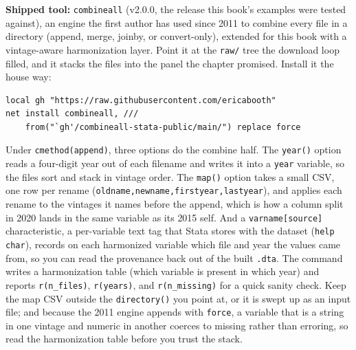 \begin{kaobox}[frametitle=Package Integration: \texttt{combineall}]
\textbf{Shipped tool:} \texttt{combineall} (v2.0.0, the release this book's examples were tested against), an engine the first author has used since 2011 to combine every file in a directory (append, merge, joinby, or convert-only), extended for this book with a vintage-aware harmonization layer. Point it at the \texttt{raw/} tree the download loop filled, and it stacks the files into the panel the chapter promised. Install it the house way:
\par
{\footnotesize
\begin{verbatim}
local gh "https://raw.githubusercontent.com/ericabooth"
net install combineall, ///
    from("`gh'/combineall-stata-public/main/") replace force
\end{verbatim}
}
Under \texttt{cmethod(append)}, three options do the combine half. The \texttt{year()} option reads a four-digit year out of each filename and writes it into a \texttt{year} variable, so the files sort and stack in vintage order. The \texttt{map()} option takes a small CSV, one row per rename (\texttt{oldname,newname,firstyear,lastyear}), and applies each rename to the vintages it names before the append, which is how a column split in 2020 lands in the same variable as its 2015 self. And a \texttt{varname[source]} characteristic, a per-variable text tag that Stata stores with the dataset (\texttt{help char}), records on each harmonized variable which file and year the values came from, so you can read the provenance back out of the built \texttt{.dta}. The command writes a harmonization table (which variable is present in which year) and reports \texttt{r(n\_files)}, \texttt{r(years)}, and \texttt{r(n\_missing)} for a quick sanity check. Keep the map CSV outside the \texttt{directory()} you point at, or it is swept up as an input file; and because the 2011 engine appends with \texttt{force}, a variable that is a string in one vintage and numeric in another coerces to missing rather than erroring, so read the harmonization table before you trust the stack.
\end{kaobox}

